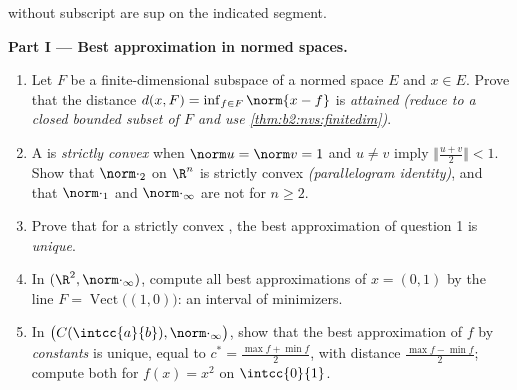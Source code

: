 \begin{problem}
\label{pb:b2:nvs:1}
 without subscript are sup  on the indicated segment.

\medskip
\noindent\textbf{Part I --- Best approximation in normed
spaces.}
\begin{enumerate}
  \item Let $F$ be a finite-dimensional subspace of a normed
        space $E$ and $x \in E$. Prove that the distance $d(x,
        F) = \inf_{f \in F}\norm{x - f}$ is \emph{attained}
        \emph{(reduce to a closed bounded subset of $F$ and use
        \cref{thm:b2:nvs:finitedim})}.
  \item A  is \emph{strictly convex} when $\norm u = \norm v
        = 1$ and $u \neq v$ imply $\bigl\Vert\frac{u +
        v}2\bigr\Vert < 1$. Show that $\norm\cdot_2$ on $\R^n$
        is strictly convex \emph{(parallelogram identity)}, and
        that $\norm\cdot_1$ and $\norm\cdot_\infty$ are not for
        $n \geq 2$.
  \item Prove that for a strictly convex , the best
        approximation of question 1 is \emph{unique}.
  \item In $(\R^2, \norm\cdot_\infty)$, compute all best
        approximations of $x = (0, 1)$ by the line $F =
        \operatorname{Vect}\bigl((1,0)\bigr)$: an interval of
        minimizers.
  \item In $\bigl(C(\intcc{a}{b}), \norm\cdot_\infty\bigr)$,
        show that the best approximation of $f$ by
        \emph{constants} is unique, equal to $c^* = \frac{\max f
        + \min f}{2}$, with distance $\frac{\max f - \min
        f}{2}$; compute both for $f(x) = x^2$ on
        $\intcc{0}{1}$.
\end{enumerate}


\end{problem}
